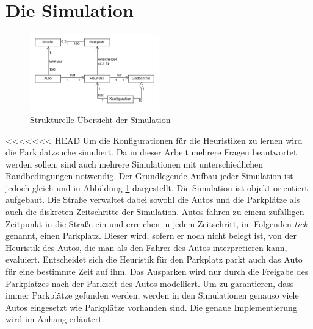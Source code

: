 \section{Die Simulation}
\begin{figure}
\includegraphics[width=0.5\textwidth]{uml/simOverview.png}
\caption{Strukturelle Übersicht der Simulation}\label{fig_simOver}
\end{figure}
<<<<<<< HEAD
Um die Konfigurationen für die Heuristiken zu lernen wird die Parkplatzsuche simuliert. Da in dieser Arbeit mehrere Fragen beantwortet werden sollen, sind auch mehrere Simulationen mit unterschiedlichen Randbedingungen notwendig. Der Grundlegende Aufbau jeder Simulation ist jedoch gleich und in Abbildung \ref{fig_simOver} dargestellt. Die Simulation ist objekt-orientiert aufgebaut. Die Straße verwaltet dabei sowohl die Autos und die Parkplätze als auch die diskreten Zeitschritte der Simulation. Autos fahren zu einem zufälligen Zeitpunkt in die Straße ein und erreichen in jedem Zeitschritt, im Folgenden \emph{tick} genannt, einen Parkplatz. Dieser wird, sofern er noch nicht belegt ist, von der Heuristik des Autos, die man als den Fahrer des Autos interpretieren kann, evaluiert. Entscheidet sich die Heuristik für den Parkplatz parkt auch das Auto für eine bestimmte Zeit auf ihm. Das Ausparken wird nur durch die Freigabe des Parkplatzes nach der Parkzeit des Autos modelliert. Um zu garantieren, dass immer Parkplätze gefunden werden, werden in den Simulationen genauso viele Autos eingesetzt wie Parkplätze vorhanden sind. Die genaue Implementierung wird im Anhang erläutert.

